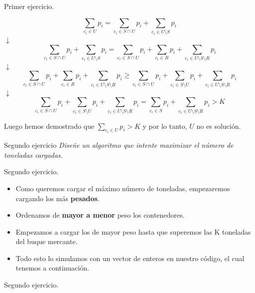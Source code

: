 \documentclass[10pt, xcolor=table]{beamer}
\begin{document}
\begin{frame}[fragile]{Primer ejercicio. }
	
	\[
	\sum_{c_{i} \in U}p_{i} = \sum_{c_{i} \in S \cap U}p_{i} + \sum_{c_{i} \in U \setminus S}p_{i}
	\]
	\centering $\downarrow$
	\[
	\sum_{c_{i} \in S \cap U}p_{i} + \sum_{c_{i} \in U \setminus S}p_{i} = \sum_{c_{i} \in S \cap U}p_{i} + \sum_{c_{i} \in R}p_{i} + \sum_{c_{i} \in U \setminus S \setminus R}p_{i}
	\]
	\centering $\downarrow$
	\[
	\sum_{c_{i} \in S \cap U}p_{i} + \sum_{c_{i} \in R}p_{i} + \sum_{c_{i} \in U \setminus S \setminus R}p_{i} \geq \sum_{c_{i} \in S \cap U}p_{i} + \sum_{c_{i} \in S \setminus U}p_{i} + \sum_{c_{i} \in U \setminus S \setminus R}p_{i}
	\]
	\centering $\downarrow$
	\[
	\sum_{c_{i} \in S \cap U}p_{i} + \sum_{c_{i} \in S \setminus U}p_{i} + \sum_{c_{i} \in U \setminus S \setminus R}p_{i} = \sum_{c_{i} \in S}p_{i} + \sum_{c_{i} \in U \setminus S \setminus R}p_{i} > K
	\]
	
	Luego hemos demostrado que $\sum_{c_{i} \in U}p_{i} > K$ y por lo tanto, $U$ no es solución.
	
\end{frame}
	
\begin{frame}[fragile]{Segundo ejercicio}
	\textit{Diseñe un algoritmo que intente maximizar el número de toneladas cargadas.}
\end{frame}

\begin{frame}[fragile]{Segundo ejercicio. }
	\begin{itemize}
		\item Como queremos cargar el máximo número de toneladas, empezaremos cargando los más \textbf{pesados}.
		\item Ordenamos de \textbf{mayor a menor} peso los contenedores.
		\item Empezamos a cargar los de mayor peso hasta que superemos las K toneladas del buque mercante.
		\item Todo esto lo simulamos con un vector de enteros en nuestro código, el cual tenemos a continuación.
	\end{itemize}
\end{frame}

\begin{frame}[fragile]{Segundo ejercicio. }
	
\end{frame}
\end{document}
